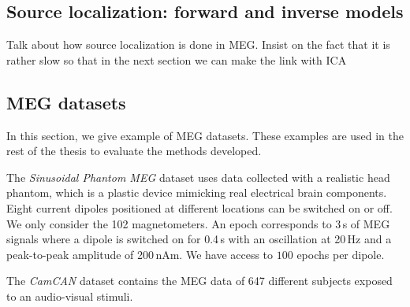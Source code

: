 \subsection{Source localization: forward and inverse models}
Talk about how source localization is done in MEG. Insist on the fact that it is
rather slow so that in the next section we can make the link with ICA
\subsection{MEG datasets}
\label{sec:meg:datasets}
In this section, we give example of MEG datasets. These examples are used in
the rest of the thesis to evaluate the methods developed.

The \emph{Sinusoidal Phantom MEG} dataset uses data collected with a realistic head phantom, which is a plastic device mimicking real electrical brain components.
% 
Eight current dipoles positioned at different locations can be switched on or off.
% 
We only consider the 102 magnetometers.
% 
An epoch corresponds to 3\,s of MEG signals where a dipole is switched on for 0.4\,s with an oscillation at 20\,Hz and a peak-to-peak amplitude of 200\,nAm.
% 
We have access to $100$ epochs per dipole.

The \emph{CamCAN} dataset contains the MEG data of 647 different subjects
exposed to an audio-visual stimuli. 
